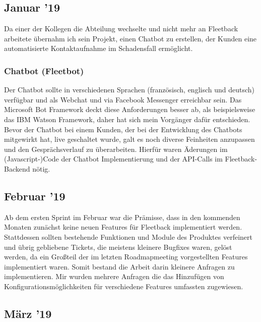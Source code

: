 \documentclass[a4paper, 11pt]{article}
\begin{document}
\subsection{Januar '19}
Da einer der Kollegen die Abteilung wechselte und nicht mehr an Fleetback arbeitete übernahm ich sein Projekt, einen Chatbot zu erstellen, der Kunden eine automatisierte Kontaktaufnahme im Schadensfall ermöglicht.

\subsubsection{Chatbot (Fleetbot)}
Der Chatbot sollte in verschiedenen Sprachen (französisch, englisch und deutsch) verfügbar und als Webchat und via Facebook Messenger erreichbar sein. Das Microsoft Bot Framework deckt diese Anforderungen besser ab, als beispielsweise das IBM Watson Framework, daher hat sich mein Vorgänger dafür entschieden. Bevor der Chatbot bei einem Kunden, der bei der Entwicklung des Chatbots mitgewirkt hat, live geschaltet wurde, galt es noch diverse Feinheiten anzupassen und den Gesprächsverlauf zu überarbeiten. Hierfür waren Äderungen im (Javascript-)Code der Chatbot Implementierung und der API-Calls im Fleetback-Backend nötig.

\subsection{Februar '19}
Ab dem ersten Sprint im Februar war die Prämisse, dass in den kommenden Monaten zunächst keine neuen Features für Fleetback implementiert werden. Stattdessen sollten bestehende Funktionen und Module des Produktes verfeinert und übrig gebliebene Tickets, die meistens kleinere Bugfixes waren, gelöst werden, da ein Großteil der im letzten Roadmapmeeting vorgestellten Features implementiert waren. Somit bestand die Arbeit darin kleinere Anfragen zu implementieren. Mir wurden mehrere Anfragen die das Hinzufügen von Konfigurationsmöglichkeiten für verschiedene Features umfassten zugewiesen.

\subsection{März '19}
\end{document}
